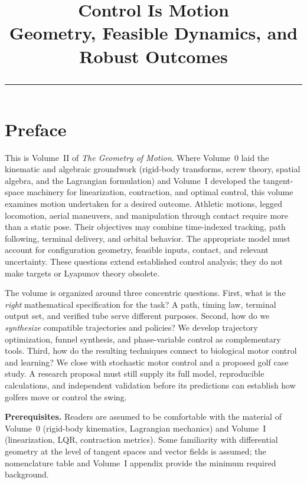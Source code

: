 \documentclass[10pt, openany]{book}
\title{%
  {\Huge\bfseries\color{chapblue} Control Is Motion}\\[0.4cm]
  {\Large Geometry, Feasible Dynamics, and Robust Outcomes}\\[0.6cm]
  {\color{chapblue}\rule{\textwidth}{2pt}}
}
\date{}
\theoremstyle{plain}
\begin{document}
\maketitle
\thispagestyle{empty}
\cleardoublepage

\chapter*{Preface}

This is Volume~II of \emph{The Geometry of Motion}. Where Volume~0 laid the
kinematic and algebraic groundwork (rigid-body transforms, screw theory,
spatial algebra, and the Lagrangian formulation) and Volume~I developed the
tangent-space machinery for linearization, contraction, and optimal control,
this volume examines motion undertaken for a desired outcome. Athletic motions,
legged locomotion, aerial maneuvers, and manipulation through contact require
more than a static pose. Their objectives may combine time-indexed tracking,
path following, terminal delivery, and orbital behavior. The appropriate model
must account for configuration geometry, feasible inputs, contact, and relevant
uncertainty. These questions extend established control analysis; they do not
make targets or Lyapunov theory obsolete.

The volume is organized around three concentric questions. First, what is the
\emph{right} mathematical specification for the task? A path, timing law,
terminal output set, and verified tube serve different purposes. Second, how
do we \emph{synthesize} compatible trajectories and policies?
We develop trajectory optimization, funnel synthesis, and phase-variable
control as complementary tools. Third, how do the resulting techniques
connect to biological motor control and learning? We close with stochastic
motor control and a proposed golf case study. A research proposal must still
supply its full model, reproducible calculations, and independent validation
before its predictions can establish how golfers move or control the swing.

\textbf{Prerequisites.} Readers are assumed to be comfortable with the
material of Volume~0 (rigid-body kinematics, Lagrangian mechanics) and
Volume~I (linearization, LQR, contraction metrics). Some familiarity with
differential geometry at the level of tangent spaces and vector fields is
assumed; the nomenclature table and Volume~I appendix provide the
minimum required background.
\end{document}
